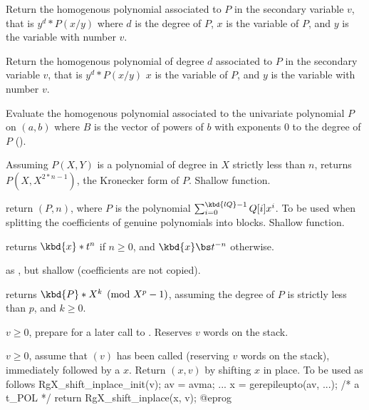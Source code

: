  Return the homogenous polynomial
associated to $P$ in the secondary variable $v$, that is $y^d*P(x/y)$ where $d$
is the degree of $P$, $x$ is the variable of $P$, and  $y$ is the variable with
number $v$.

 Return the homogenous polynomial
of degree $d$ associated to $P$ in the secondary variable $v$, that is $y^d*P(x/y)$
$x$ is the variable of $P$, and  $y$ is the variable with number $v$.

Evaluate the homogenous polynomial associated to the univariate polynomial
$P$ on $(a,b)$ where $B$ is the vector of powers of $b$ with exponents
$0$ to the degree of $P$ ().

 Assuming $P(X,Y)$ is a polynomial
of degree in $X$ strictly less than $n$, returns $P(X,X^{2*n-1})$, the
Kronecker form of $P$. Shallow function.

 return
$(P, n)$, where $P$ is the polynomial
$\sum_{i = 0}^{\kbd{lQ} - 1} Q[i] x^i$. To be used when splitting
the coefficients of genuine polynomials into blocks. Shallow function.


 returns $\kbd{x} * t^n$ if $n\geq 0$,
and $\kbd{x} \bs t^{-n}$ otherwise.

 as , but
shallow (coefficients are not copied).

 returns $\kbd{P} * X^k
\pmod {X^p-1}$, assuming the degree of $P$ is strictly less than $p$, and
$k\geq 0$.

 $v \geq 0$, prepare for a later
call to . Reserves $v$ words on the stack.

 $v \geq 0$, assume that
$(v)$ has been called (reserving $v$ words on the
stack), immediately followed by a  $x$. Return $(x,v)$
by shifting $x$ in place. To be used as follows
\bprog
  RgX_shift_inplace_init(v);
  av = avma;
  ...
  x = gerepileupto(av, ...); /* a t_POL */
  return RgX_shift_inplace(x, v);
@eprog

